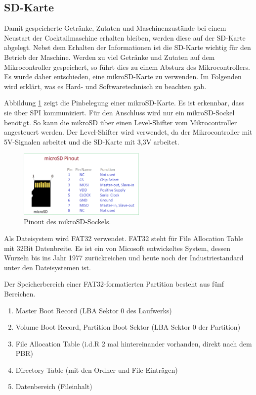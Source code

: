 \subsection{SD-Karte}
\label{subsec:SD-Karte}

Damit gespeicherte Getränke, Zutaten und Maschinenzustände bei einem Neustart der Cocktailmaschine erhalten bleiben, werden diese auf der SD-Karte abgelegt. Nebst dem Erhalten der Informationen ist die SD-Karte wichtig für den Betrieb der Maschine. Werden zu viel Getränke und Zutaten auf dem Mikrocontroller gespeichert, so führt dies zu einem Absturz des Mikrocontrollers. Es wurde daher entschieden, eine mikroSD-Karte zu verwenden. Im Folgenden wird erklärt, was es Hard- und Softwaretechnisch zu beachten gab.

Abbildung \ref{fig:micro_sd_pinout} zeigt die Pinbelegung einer mikroSD-Karte. Es ist erkennbar, dass sie über SPI kommuniziert. Für den Anschluss wird nur ein mikroSD-Sockel benötigt. So kann die mikroSD über einen Level-Shifter vom Mikrocontroller angesteuert werden. Der Level-Shifter wird verwendet, da der Mikrocontroller mit 5V-Signalen arbeitet und die SD-Karte mit 3,3V arbeitet.

\begin{figure}[H]
	\centering
	\includegraphics[width=0.55\textwidth]{graphics/micro-sd-pinout}
	\caption{Pinout des mikroSD-Sockels. \cite{theorycircuitcom_arduino_2018}}
	\label{fig:micro_sd_pinout}
\end{figure}

Als Dateisystem wird FAT32 verwendet. FAT32 steht für File Allocation Table mit 32Bit Datenbreite. Es ist ein von Micosoft entwickeltes System, dessen Wurzeln bis ins Jahr 1977 zurückreichen und heute noch der Industriestandard unter den Dateisystemen ist. \cite{ionosde_fat32_2020}

Der Speicherbereich einer FAT32-formatierten Partition besteht aus fünf Bereichen. \cite{milsch_aufbau_2009}
\begin{enumerate}
\item Master Boot Record (LBA Sektor 0 des Laufwerks)
\item Volume Boot Record, Partition Boot Sektor (LBA Sektor 0 der Partition)
\item File Allocation Table (i.d.R 2 mal hintereinander vorhanden, direkt nach dem PBR)
\item Directory Table (mit den Ordner und File-Einträgen)
\item Datenbereich (Fileinhalt)
\end{enumerate}

